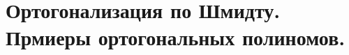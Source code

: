 \documentclass[../../calc-math-exam-2023.tex]{subfiles}
\begin{document}
    \section{Ортогонализация по Шмидту. Прмиеры ортогональных полиномов.}\label{sec:ch15}
\end{document}
